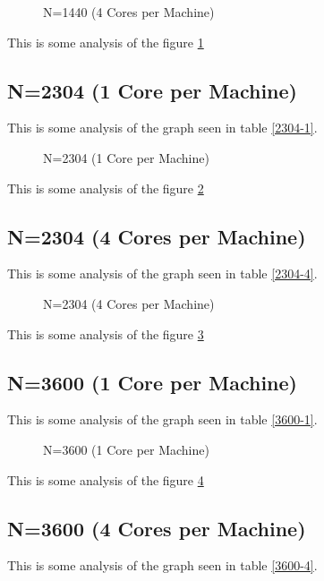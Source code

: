 \documentclass[a4paper]{article}
\begin{document}
\begin{figure}
    
    \caption{N=1440 (4 Cores per Machine)}
    \label{fig:1440_4}
\end{figure}

This is some analysis of the figure \ref{fig:1440_4}

\subsection{N=2304 (1 Core per Machine)}

This is some analysis of the graph seen in table \ref{2304-1}.

\begin{figure}
    
    \caption{N=2304 (1 Core per Machine)}
    \label{fig:2304_1}
\end{figure}

This is some analysis of the figure \ref{fig:2304_1}

\subsection{N=2304 (4 Cores per Machine)}

This is some analysis of the graph seen in table \ref{2304-4}.

\begin{figure}
    
    \caption{N=2304 (4 Cores per Machine)}
    \label{fig:2304_4}
\end{figure}

This is some analysis of the figure \ref{fig:2304_4}

\subsection{N=3600 (1 Core per Machine)}

This is some analysis of the graph seen in table \ref{3600-1}.

\begin{figure}
    
    \caption{N=3600 (1 Core per Machine)}
    \label{fig:3600_1}
\end{figure}

This is some analysis of the figure \ref{fig:3600_1}

\subsection{N=3600 (4 Cores per Machine)}

This is some analysis of the graph seen in table \ref{3600-4}.
\end{document}
